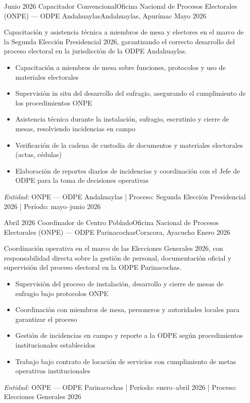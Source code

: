 \begin{experiences}

\experience
{Junio 2026} {Capacitador Convencional}{Oficina Nacional de Procesos Electorales (ONPE) — ODPE Andahuaylas}{Andahuaylas, Apurímac}
{Mayo 2026} {
	Capacitación y asistencia técnica a miembros de mesa y electores en el marco de la Segunda Elección Presidencial 2026, garantizando el correcto desarrollo del proceso electoral en la jurisdicción de la ODPE Andahuaylas.
	\begin{itemize}
		\item Capacitación a miembros de mesa sobre funciones, protocolos y uso de materiales electorales
		\item Supervisión in situ del desarrollo del sufragio, asegurando el cumplimiento de los procedimientos ONPE
		\item Asistencia técnica durante la instalación, sufragio, escrutinio y cierre de mesas, resolviendo incidencias en campo
		\item Verificación de la cadena de custodia de documentos y materiales electorales (actas, cédulas)
		\item Elaboración de reportes diarios de incidencias y coordinación con el Jefe de ODPE para la toma de decisiones operativas
	\end{itemize}
}
{\footnotesize{\emph{Entidad:} ONPE — ODPE Andahuaylas | Proceso: Segunda Elección Presidencial 2026 | Período: mayo–junio 2026}}
\emptySeparator

\experience
{Abril 2026} {Coordinador de Centro Poblado}{Oficina Nacional de Procesos Electorales (ONPE) — ODPE Parinacochas}{Coracora, Ayacucho}
{Enero 2026} {
	Coordinación operativa en el marco de las Elecciones Generales 2026, con responsabilidad directa sobre la gestión de personal, documentación oficial y supervisión del proceso electoral en la ODPE Parinacochas.
	\begin{itemize}
		\item Supervisión del proceso de instalación, desarrollo y cierre de mesas de sufragio bajo protocolos ONPE
		\item Coordinación con miembros de mesa, personeros y autoridades locales para garantizar el proceso
		\item Gestión de incidencias en campo y reporte a la ODPE según procedimientos institucionales establecidos
		\item Trabajo bajo contrato de locación de servicios con cumplimiento de metas operativas institucionales
	\end{itemize}
}
{\footnotesize{\emph{Entidad:} ONPE — ODPE Parinacochas | Período: enero–abril 2026 | Proceso: Elecciones Generales 2026}}
\emptySeparator


\end{experiences}
